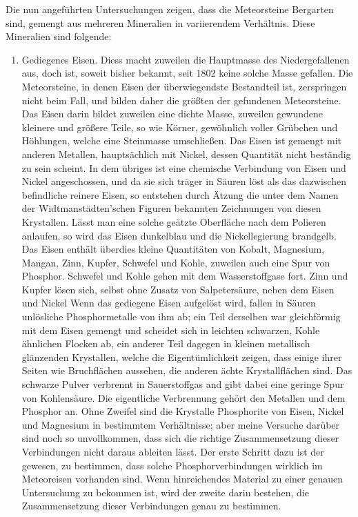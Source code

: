 \documentclass[a4paper, 11pt, oneside]{article}
\begin{document}
Die nun angeführten Untersuchungen zeigen, dass die Meteorsteine Bergarten sind, gemengt aus mehreren Mineralien in variierendem Verhältnis. Diese Mineralien sind folgende:
\begin{enumerate}
    \item Gediegenes Eisen. Diess macht zuweilen die Hauptmasse des Niedergefallenen aus, doch ist, soweit bisher bekannt, seit 1802 keine solche Masse gefallen. Die Meteorsteine, in denen Eisen der überwiegendste Bestandteil ist, zerspringen nicht beim Fall, und bilden daher die größten der gefundenen Meteorsteine. Das Eisen darin bildet zuweilen eine dichte Masse, zuweilen gewundene kleinere und größere Teile, so wie Körner, gewöhnlich voller Grübchen und Höhlungen, welche eine Steinmasse umschließen. Das Eisen ist gemengt mit anderen Metallen, hauptsächlich mit Nickel, dessen Quantität nicht beständig zu sein scheint. In dem übriges ist eine chemische Verbindung von Eisen und Nickel angeschossen, und da sie sich träger in Säuren löst als das dazwischen befindliche reinere Eisen, so entstehen durch Ätzung die unter dem Namen der Widtmanstädten'schen Figuren bekannten Zeichnungen von diesen Krystallen. Lässt man eine solche geätzte Oberfläche nach dem Polieren anlaufen, so wird das Eisen dunkelblau und die Nickellegierung brandgelb. Das Eisen enthält überdies kleine Quantitäten von Kobalt, Magnesium, Mangan, Zinn, Kupfer, Schwefel und Kohle, zuweilen auch eine Spur von Phosphor. Schwefel und Kohle gehen mit dem Wasserstoffgase fort. Zinn und Kupfer lösen sich, selbst ohne Zusatz von Salpetersäure, neben dem Eisen und Nickel Wenn das gediegene Eisen aufgelöst wird, fallen in Säuren unlösliche Phosphormetalle von ihm ab; ein Teil derselben war gleichförmig mit dem Eisen gemengt und scheidet sich in leichten schwarzen, Kohle ähnlichen Flocken ab, ein anderer Teil dagegen in kleinen metallisch glänzenden Krystallen, welche die Eigentümlichkeit zeigen, dass einige ihrer Seiten wie Bruchflächen aussehen, die anderen ächte Krystallflächen sind. Das schwarze Pulver verbrennt in Sauerstoffgas and gibt dabei eine geringe Spur von Kohlensäure. Die eigentliche Verbrennung gehört den Metallen und dem Phosphor an. Ohne Zweifel sind die Krystalle Phosphorite von Eisen, Nickel und Magnesium in bestimmtem Verhältnisse; aber meine Versuche darüber sind noch so unvollkommen, dass sich die richtige Zusammensetzung dieser Verbindungen nicht daraus ableiten lässt. Der erste Schritt dazu ist der gewesen, zu bestimmen, dass solche Phosphorverbindungen wirklich im Meteoreisen vorhanden sind. Wenn hinreichendes Material zu einer genauen Untersuchung zu bekommen ist, wird der zweite darin bestehen, die Zusammensetzung dieser Verbindungen genau zu bestimmen.

\end{enumerate}
\end{document}
